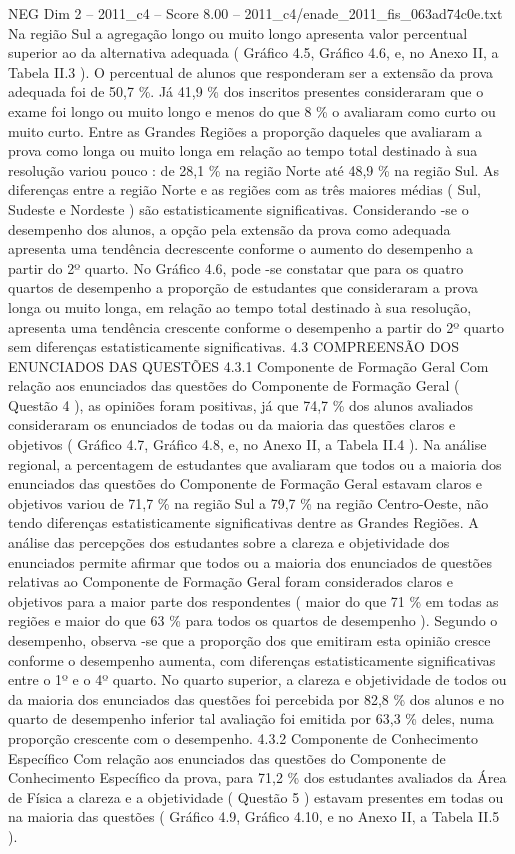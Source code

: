 \begin{textsample}{NEG Dim 2 – 2011\_c4 – Score 8.00 – 2011\_c4/enade\_2011\_fis\_063ad74c0e.txt}
Na região Sul a agregação longo ou muito longo apresenta valor percentual superior ao da alternativa adequada ( Gráfico 4.5, Gráfico 4.6, e, no Anexo II, a Tabela II.3 ).
O percentual de alunos que responderam ser a extensão da prova adequada foi de 50,7 \%.
Já 41,9 \% dos inscritos presentes consideraram que o exame foi longo ou muito longo e menos do que 8 \% o avaliaram como curto ou muito curto.
Entre as Grandes Regiões a proporção daqueles que avaliaram a prova como longa ou muito longa em relação ao tempo total destinado à sua resolução variou pouco : de 28,1 \% na região Norte até 48,9 \% na região Sul.
As diferenças entre a região Norte e as regiões com as três maiores médias ( Sul, Sudeste e Nordeste ) são estatisticamente significativas.
Considerando -se o desempenho dos alunos, a opção pela extensão da prova como adequada apresenta uma tendência decrescente conforme o aumento do desempenho a partir do 2º quarto.
No Gráfico 4.6, pode -se constatar que para os quatro quartos de desempenho a proporção de estudantes que consideraram a prova longa ou muito longa, em relação ao tempo total destinado à sua resolução, apresenta uma tendência crescente conforme o desempenho a partir do 2º quarto sem diferenças estatisticamente significativas. 4.3 COMPREENSÃO DOS ENUNCIADOS DAS QUESTÕES 4.3.1 Componente de Formação Geral Com relação aos enunciados das questões do Componente de Formação Geral ( Questão 4 ), as opiniões foram positivas, já que 74,7 \% dos alunos avaliados consideraram os enunciados de todas ou da maioria das questões claros e objetivos ( Gráfico 4.7, Gráfico 4.8, e, no Anexo II, a Tabela II.4 ).
Na análise regional, a percentagem de estudantes que avaliaram que todos ou a maioria dos enunciados das questões do Componente de Formação Geral estavam claros e objetivos variou de 71,7 \% na região Sul a 79,7 \% na região Centro-Oeste, não tendo diferenças estatisticamente significativas dentre as Grandes Regiões.
A análise das percepções dos estudantes sobre a clareza e objetividade dos enunciados permite afirmar que todos ou a maioria dos enunciados de questões relativas ao Componente de Formação Geral foram considerados claros e objetivos para a maior parte dos respondentes ( maior do que 71 \% em todas as regiões e maior do que 63 \% para todos os quartos de desempenho ).
Segundo o desempenho, observa -se que a proporção dos que emitiram esta opinião cresce conforme o desempenho aumenta, com diferenças estatisticamente significativas entre o 1º e o 4º quarto.
No quarto superior, a clareza e objetividade de todos ou da maioria dos enunciados das questões foi percebida por 82,8 \% dos alunos e no quarto de desempenho inferior tal avaliação foi emitida por 63,3 \% deles, numa proporção crescente com o desempenho. 4.3.2 Componente de Conhecimento Específico Com relação aos enunciados das questões do Componente de Conhecimento Específico da prova, para 71,2 \% dos estudantes avaliados da Área de Física a clareza e a objetividade ( Questão 5 ) estavam presentes em todas ou na maioria das questões ( Gráfico 4.9, Gráfico 4.10, e no Anexo II, a Tabela II.5 ).

\end{textsample}

